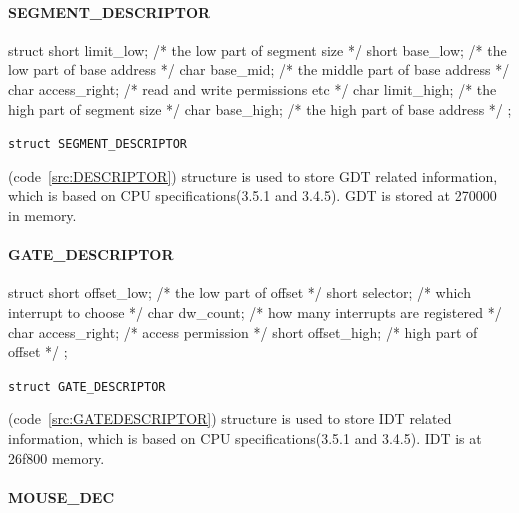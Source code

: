 \documentclass{swfcthesis}
\begin{document}
\paragraph{SEGMENT\_DESCRIPTOR}

\begin{listing}[H]
  \begin{codeblock}
\begin{ccode}
struct 
{ 
  short limit_low;   /* the low part of segment size */
  short base_low;    /* the low part of base address */
  char base_mid;     /* the middle part of base address */
  char access_right; /* read and write permissions etc */
  char  limit_high;  /* the high part of segment size */
  char base_high;    /* the high part of base address */
};
\end{ccode}
  \end{codeblock}
  \caption{\texttt{struct SEGMENT\_DESCRIPTOR}}\label{src:DESCRIPTOR}
\end{listing}

(code~\ref{src:DESCRIPTOR}) structure is
used to store GDT related information, which is based on CPU specifications(3.5.1 and
3.4.5\cite{intel_3a}). GDT is stored at 270000 in memory.


\paragraph{GATE\_DESCRIPTOR}

\begin{listing}[H]
  \begin{codeblock}
\begin{ccode}
struct 
{ 
  short offset_low;   /* the low part of offset */
  short selector;     /* which interrupt to choose */
  char dw_count;      /* how many interrupts are registered */
  char access_right;  /* access permission */
  short  offset_high; /* high part of offset */
};
\end{ccode}
  \end{codeblock}
  \caption{\texttt{struct GATE\_DESCRIPTOR}}\label{src:GATEDESCRIPTOR}
\end{listing}

(code~\ref{src:GATEDESCRIPTOR}) structure is used to
store IDT related information, which is based on CPU specifications(3.5.1 and
3.4.5\cite{intel_3a}). IDT is at 26f800 memory.


\paragraph{MOUSE\_DEC}
\end{document}
